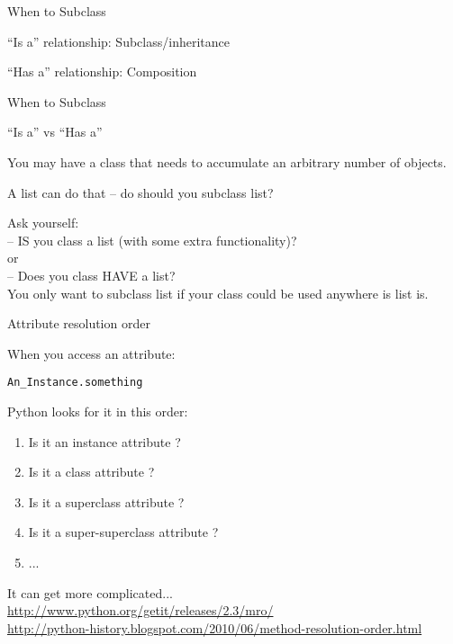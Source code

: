 \documentclass{beamer}
\begin{document}
\begin{frame}[fragile]{When to Subclass}

\vfill
{\Large ``Is a'' relationship: Subclass/inheritance}

\vfill
{\Large ``Has a'' relationship: Composition}
\end{frame}

\begin{frame}[fragile]{When to Subclass}

{\Large ``Is a'' vs ``Has a'' }

\vfill
You may have a class that needs to accumulate an arbitrary number of objects.

\vfill
A list can do that -- do should you subclass list?

\vfill
Ask yourself:\\

\vfill
-- IS you class a list (with some extra functionality)?\\
\hspace{0.4in}or\\
-- Does you class HAVE a list?\\

\vfill
You only want to subclass list if your class could be used anywhere is list is.
\end{frame}

\begin{frame}[fragile]{Attribute resolution order}

{\Large When you access an attribute:

\vfill
\hspace{0.2in}\verb|An_Instance.something|}

\vfill
{\Large Python looks for it in this order:}

\vfill
\begin{enumerate}
  \item Is it an instance attribute ?
  \item Is it a class attribute ?
  \item Is it a superclass attribute ?
  \item Is it a super-superclass attribute ?
  \item ...
\end{enumerate}

\vfill
It can get more complicated...\\
{\small
\url{http://www.python.org/getit/releases/2.3/mro/} \\
\url{http://python-history.blogspot.com/2010/06/method-resolution-order.html}
}
\end{frame} 
\end{document}
